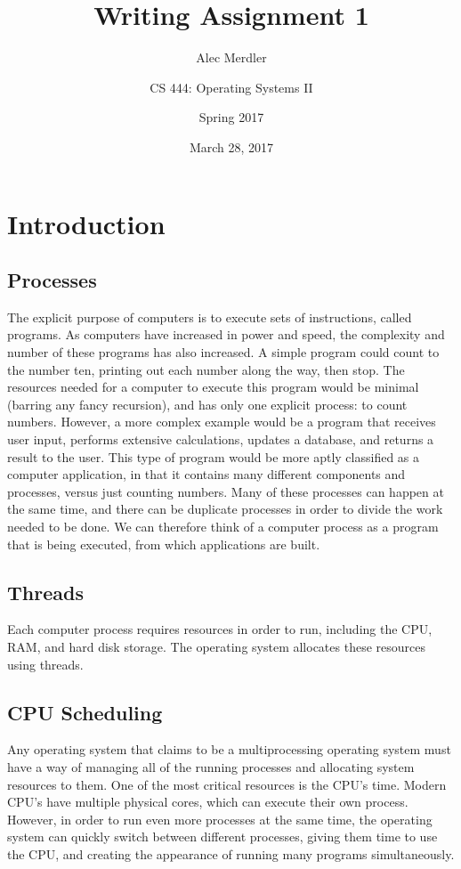 \documentclass[letterpaper,draftclsnofoot,10pt,onecolumn,titlepage]{IEEEtran}\usepackage[margin=0.75in]{geometry}
\title{Writing Assignment 1}
\author{
	Alec Merdler\\
	\and
	CS 444: Operating Systems II\\
	\and
	Spring 2017\\
}
\date{March 28, 2017}
\begin{document}
\begin{titlepage}
\clearpage\maketitle
\thispagestyle{empty}

\maketitle
\end{titlepage}

\section{Introduction}
    \subsection{Processes}
    The explicit purpose of computers is to execute sets of instructions, called programs. As computers have increased
    in power and speed, the complexity and number of these programs has also increased. A simple program could count
    to the number ten, printing out each number along the way, then stop. The resources needed for a computer to
    execute this program would be minimal (barring any fancy recursion), and has only one explicit process: to
    count numbers. However, a more complex example would be a program that receives user input, performs extensive
    calculations, updates a database, and returns a result to the user. This type of program would be more aptly
    classified as a computer application, in that it contains many different components and processes, versus just
    counting numbers. Many of these processes can happen at the same time, and there can be duplicate processes in
    order to divide the work needed to be done. We can therefore think of a computer process as a program that is
    being executed, from which applications are built.

    \subsection{Threads}
    Each computer process requires resources in order to run, including the CPU, RAM, and hard disk storage. The
    operating system allocates these resources using threads.

    \subsection{CPU Scheduling}
    Any operating system that claims to be a multiprocessing operating system must have a way of managing all of
    the running processes and allocating system resources to them. One of the most critical resources is the CPU's
    time. Modern CPU's have multiple physical cores, which can execute their own process. However, in order to run
    even more processes at the same time, the operating system can quickly switch between different processes, giving
    them time to use the CPU, and creating the appearance of running many programs simultaneously.
\end{document}
